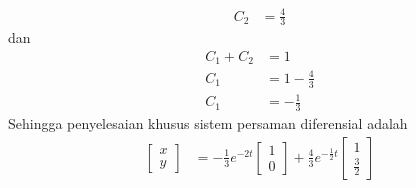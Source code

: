 \documentclass{article}
\begin{document}
\begin{enumerate}[label=\alph*.]
\begin{align*}
        C_2&=\frac{4}{3}
    \end{align*}
    dan \begin{align*}
        C_1+C_2&=1\\
        C_1&=1-\frac{4}{3} \\
        C_1 &= -\frac{1}{3}
    \end{align*}
    Sehingga penyelesaian khusus sistem persaman diferensial adalah
    \begin{align*}
        \begin{bmatrix}
            x \\ y
        \end{bmatrix} &= -\frac{1}{3}e^{-2t} \begin{bmatrix}
            1 \\ 0
        \end{bmatrix} + \frac{4}{3}e^{-\frac{1}{2}t}  \begin{bmatrix}
            1 \\ \frac{3}{2}
        \end{bmatrix}
    \end{align*}


\end{enumerate}
\end{document}
